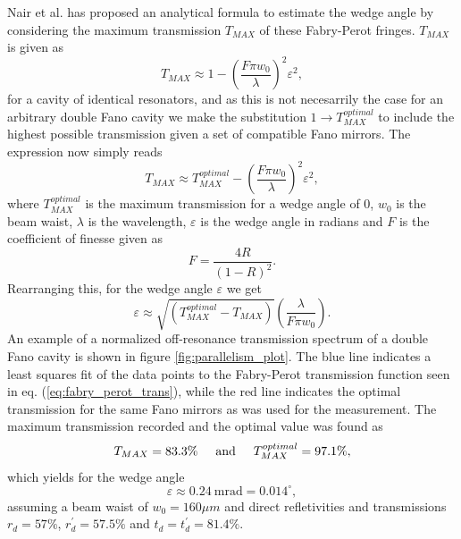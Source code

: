 Nair et al. \cite{Nair} has proposed an analytical formula to estimate the wedge angle by considering the maximum transmission $T_{MAX}$ of these Fabry-Perot fringes. $T_{MAX}$ is given as 
\begin{equation}
    T_{MAX} \approx 1 - \left(\frac{F \pi w_0}{\lambda}\right)^2 \varepsilon^2,
\end{equation}
for a cavity of identical resonators, and as this is not necesarrily the case for an arbitrary double Fano cavity we make the substitution $1 \rightarrow T_{MAX}^{optimal}$ to include the highest possible transmission given a set of compatible Fano mirrors. The expression now simply reads
\begin{equation}
    T_{MAX} \approx T_{MAX}^{optimal} - \left(\frac{F \pi w_0}{\lambda}\right)^2 \varepsilon^2,
\end{equation}
where $T_{MAX}^{optimal}$ is the maximum transmission for a wedge angle of $0$, $w_0$ is the beam waist, $\lambda$ is the wavelength, $\varepsilon$ is the wedge angle in radians and $F$ is the coefficient of finesse \cite{Pedrotti} given as
\begin{equation}
    F = \frac{4R}{(1-R)^2}.
\end{equation}
Rearranging this, for the wedge angle $\varepsilon$ we get
\begin{equation}
    \varepsilon \approx \sqrt{\left(T_{MAX}^{optimal} - T_{MAX} \right)} \left(\frac{\lambda}{F \pi w_0}\right).
\end{equation}
An example of a normalized off-resonance transmission spectrum of a double Fano cavity is shown in figure \ref{fig:parallelism_plot}. The blue line indicates a least squares fit of the data points to the Fabry-Perot transmission function seen in eq. (\ref{eq:fabry_perot_trans}), while the red line indicates the optimal transmission for the same Fano mirrors as was used for the measurement. The maximum transmission recorded and the optimal value was found as
\begin{equation}
    T_{MAX} = 83.3\% \hspace{0.5cm} \text{and} \hspace{0.5cm} T_{MAX}^{optimal} = 97.1\%,
\end{equation}
which yields for the wedge angle 
\begin{equation}
    \varepsilon \approx 0.24 \: \text{mrad} = 0.014^{\circ},
\end{equation}
assuming a beam waist of $w_0 = 160 \mu m$ and direct refletivities and transmissions $r_d = 57\%$, $r_d^{\prime} = 57.5\%$ and $t_d = t_d^{\prime} = 81.4\%$.

